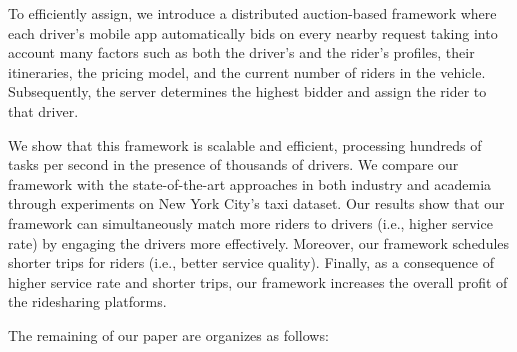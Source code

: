 
To efficiently assign, we introduce a distributed auction-based framework where each driver's mobile app automatically bids on every nearby request taking into account many factors such as both the driver's and the rider's profiles, their itineraries, the pricing model, and the current number of riders in the vehicle.  Subsequently, the server determines the highest bidder and assign the rider to that driver. 

We show that this framework is scalable and efficient, processing hundreds of tasks per second in the presence of thousands of drivers. We compare our framework with the state-of-the-art approaches in both industry and academia through experiments on New York City's taxi dataset. Our results show that our framework can simultaneously match more riders to drivers (i.e., higher service rate) by engaging the drivers more effectively. Moreover, our framework schedules shorter trips for riders (i.e., better service quality). Finally, as a consequence of higher service rate and shorter trips, our framework increases the overall profit of the ridesharing platforms.

The remaining of our paper are organizes as follows:





